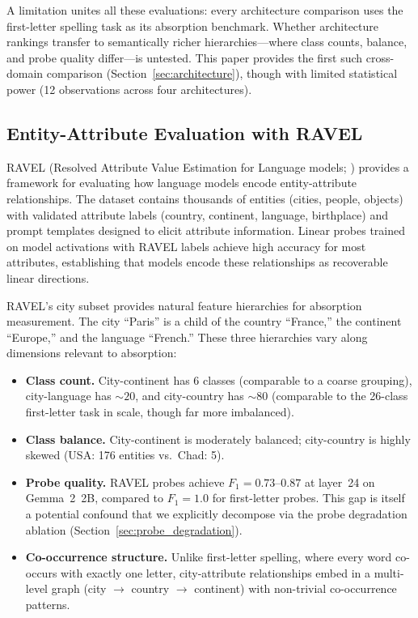 \documentclass{article}
\begin{document}
A limitation unites all these evaluations: every architecture comparison uses the first-letter spelling task as its absorption benchmark. Whether architecture rankings transfer to semantically richer hierarchies---where class counts, balance, and probe quality differ---is untested. This paper provides the first such cross-domain comparison (Section~\ref{sec:architecture}), though with limited statistical power (12 observations across four architectures).

\subsection{Entity-Attribute Evaluation with RAVEL}

RAVEL (Resolved Attribute Value Estimation for Language models; \citealp{huang2024ravel}) provides a framework for evaluating how language models encode entity-attribute relationships. The dataset contains thousands of entities (cities, people, objects) with validated attribute labels (country, continent, language, birthplace) and prompt templates designed to elicit attribute information. Linear probes trained on model activations with RAVEL labels achieve high accuracy for most attributes, establishing that models encode these relationships as recoverable linear directions.

RAVEL's city subset provides natural feature hierarchies for absorption measurement. The city ``Paris'' is a child of the country ``France,'' the continent ``Europe,'' and the language ``French.'' These three hierarchies vary along dimensions relevant to absorption:

\begin{itemize}
\item \textbf{Class count.} City-continent has 6 classes (comparable to a coarse grouping), city-language has ${\sim}20$, and city-country has ${\sim}80$ (comparable to the 26-class first-letter task in scale, though far more imbalanced).
\item \textbf{Class balance.} City-continent is moderately balanced; city-country is highly skewed (USA: 176 entities vs.\ Chad: 5).
\item \textbf{Probe quality.} RAVEL probes achieve $F_1 = 0.73$--$0.87$ at layer~24 on Gemma~2~2B, compared to $F_1 = 1.0$ for first-letter probes. This gap is itself a potential confound that we explicitly decompose via the probe degradation ablation (Section~\ref{sec:probe_degradation}).
\item \textbf{Co-occurrence structure.} Unlike first-letter spelling, where every word co-occurs with exactly one letter, city-attribute relationships embed in a multi-level graph (city $\to$ country $\to$ continent) with non-trivial co-occurrence patterns.
\end{itemize}
\end{document}
